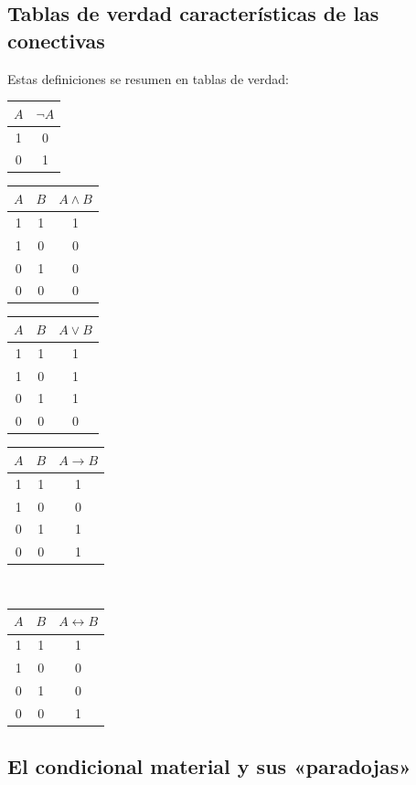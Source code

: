\subsection{Tablas de verdad características de las conectivas}

Estas definiciones se resumen en tablas de verdad:

\vspace{0.3cm}
\begin{center}
\begin{tabular}{c|c}
$A$ & $\neg A$ \\
\hline
1 & 0 \\
0 & 1
\end{tabular}
\qquad
\begin{tabular}{cc|c}
$A$ & $B$ & $A \land B$ \\
\hline
1 & 1 & 1 \\
1 & 0 & 0 \\
0 & 1 & 0 \\
0 & 0 & 0
\end{tabular}
\qquad
\begin{tabular}{cc|c}
$A$ & $B$ & $A \lor B$ \\
\hline
1 & 1 & 1 \\
1 & 0 & 1 \\
0 & 1 & 1 \\
0 & 0 & 0
\end{tabular}
\qquad
\begin{tabular}{cc|c}
$A$ & $B$ & $A \to B$ \\
\hline
1 & 1 & 1 \\
1 & 0 & 0 \\
0 & 1 & 1 \\
0 & 0 & 1
\end{tabular}
\\[1cm]
\begin{tabular}{cc|c}
$A$ & $B$ & $A \leftrightarrow B$ \\
\hline
1 & 1 & 1 \\
1 & 0 & 0 \\
0 & 1 & 0 \\
0 & 0 & 1
\end{tabular}
\end{center}
\vspace{0.3cm}

\subsection{El condicional material y sus «paradojas»}\label{sec:condicional-material}

